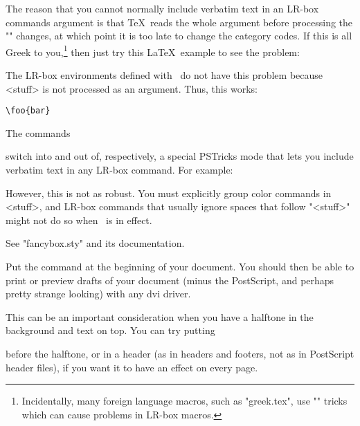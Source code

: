 The reason that you cannot normally include verbatim text in an LR-box
commands argument is that \TeX\ reads the whole argument before processing the
"\catcode" changes, at which point it is too late to change the category
codes. If this is all Greek to you,\footnote{Incidentally, many foreign
language macros, such as "greek.tex", use "\catcode" tricks which can cause
problems in LR-box macros.} then just try this \LaTeX\ example to see the
problem:
\begin{LVerbatim}
\end{LVerbatim}

The LR-box environments defined with \n\pslongbox\ do not have this problem
because <stuff> is not processed as an argument. Thus, this works:
\begin{example}
  \MyFrame \verb+\foo{bar}+\endMyFrame
\end{example}

The commands
\begin{Ex}
  \object  \psverbboxtrue
  \object  \psverbboxfalse
\end{Ex}
switch into and out of, respectively, a special PSTricks mode that lets you
include verbatim text in any LR-box command. For example:
\begin{example}
  \psverbboxtrue
\end{example}
However, this is not as robust. You must explicitly group color commands in
<stuff>, and LR-box commands that usually ignore spaces that follow
"{<stuff>}" might not do so when \n\psverbboxtrue\ is in effect.




See "fancybox.sty" and its documentation.


Put the command
  \Mac  \PSTricksOff
at the beginning of your document. You should then be able to print or preview
drafts of your document (minus the PostScript, and perhaps pretty strange
looking) with any dvi driver.



This can be an important consideration when you have a halftone in the
background and text on top. You can try putting
\begin{LVerb}
\end{LVerb}
before the halftone, or in a header (as in headers and footers, not as in
PostScript header files),  if you want it to have an effect on every page.

